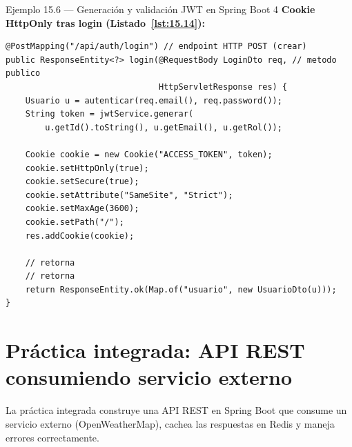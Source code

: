 \begin{cajaejemplo}{Ejemplo 15.6 --- Generación y validación JWT en Spring Boot 4}
\textbf{Cookie HttpOnly tras login (Listado~\ref{lst:15.14}):}
\begin{lstlisting}[style=java,numbers=none,caption={Ejemplo de Java},label=lst:15.14]
@PostMapping("/api/auth/login") // endpoint HTTP POST (crear)
public ResponseEntity<?> login(@RequestBody LoginDto req, // metodo publico
                               HttpServletResponse res) {
    Usuario u = autenticar(req.email(), req.password());
    String token = jwtService.generar(
        u.getId().toString(), u.getEmail(), u.getRol());

    Cookie cookie = new Cookie("ACCESS_TOKEN", token);
    cookie.setHttpOnly(true);
    cookie.setSecure(true);
    cookie.setAttribute("SameSite", "Strict");
    cookie.setMaxAge(3600);
    cookie.setPath("/");
    res.addCookie(cookie);

    // retorna
    // retorna
    return ResponseEntity.ok(Map.of("usuario", new UsuarioDto(u)));
}
\end{lstlisting}
\end{cajaejemplo}

\section{Práctica integrada: API REST consumiendo servicio externo}

La práctica integrada construye una API REST en Spring
Boot que consume un servicio externo (OpenWeatherMap), cachea las
respuestas en Redis y maneja errores correctamente.


